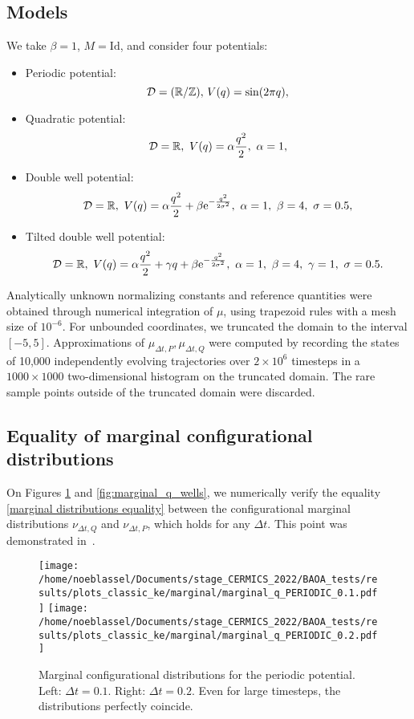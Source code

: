 \subsection{Models}\label{models}
 We take $\beta=1$, $M=\mathrm{Id}$, and consider four potentials:
\begin{itemize}
  \item Periodic potential: $$ \mathcal D = (\mathbb{R}/\mathbb Z),\,V(q)=\sin(2\pi q), $$
  \item Quadratic potential: $$ \mathcal D = \mathbb{R},\ V(q)=\alpha \frac{q^2}2,\ \alpha=1,$$
  \item Double well potential: $$ \mathcal D = \R,\ V(q)=\alpha \frac{q^2}2 +\beta\mathrm{e}^{-\frac{q^2}{2\sigma^2}},\ \alpha=1,\ \beta=4,\ \sigma=0.5,$$
  \item Tilted double well potential: $$ \mathcal D = \R,\ V(q)=\alpha \frac{q^2}2 + \gamma q+\beta\mathrm{e}^{-\frac{q^2}{2\sigma^2}},\ \alpha=1,\ \beta=4,\ \gamma=1,\ \sigma=0.5.$$
\end{itemize}
Analytically unknown normalizing constants and reference quantities were obtained through numerical integration of $\mu$, using trapezoid rules with a mesh size of $10^{-6}$. For unbounded coordinates, we truncated the domain to the interval $[-5,5]$.
Approximations of $\mu_{\Delta t,P},\mu_{\Delta t,Q}$ were computed by recording the states of 10,000 independently evolving trajectories over $2\times 10^6$ timesteps in a $1000\times1000$ two-dimensional histogram on the truncated domain. The rare sample points outside of the truncated domain were discarded.

\subsection{Equality of marginal configurational distributions}\label{nuP equals nuQ}
On Figures  \ref{fig:marginal_q_periodic} and \ref{fig:marginal_q_wells}, we numerically verify the equality \eqref{marginal distributions equality} between the configurational marginal distributions $\nu_{\Delta t,Q}$ and $\nu_{\Delta t,P}$, which holds for any $\Delta t$. This point was demonstrated in~\cite{KK22}.
\begin{figure}[htbp]
  \begin{center}
    \texttt{[image: /home/noeblassel/Documents/stage\_CERMICS\_2022/BAOA\_tests/results/plots\_classic\_ke/marginal/marginal\_q\_PERIODIC\_0.1.pdf]}
    \texttt{[image: /home/noeblassel/Documents/stage\_CERMICS\_2022/BAOA\_tests/results/plots\_classic\_ke/marginal/marginal\_q\_PERIODIC\_0.2.pdf]}
    
    \caption{ \label{fig:marginal_q_periodic}
      Marginal configurational distributions for the periodic potential. Left: $\Delta t=0.1$. Right: $\Delta t=0.2$. Even for large timesteps, the distributions perfectly coincide.
    }
  \end{center}
\end{figure}

